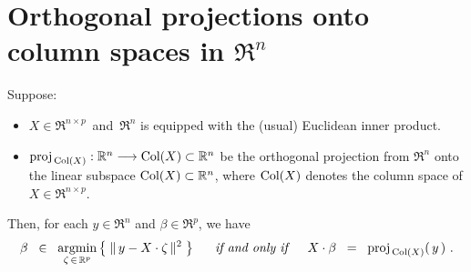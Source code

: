 

\section{Orthogonal projections onto column spaces in $\Re^{n}$}
\setcounter{theorem}{0}
\setcounter{equation}{0}

\renewcommand{\theenumi}{\roman{enumi}}
\renewcommand{\labelenumi}{\textnormal{(\theenumi)}$\;\;$}


\begin{proposition}
\mbox{}
\vskip 0.1cm
\noindent
Suppose:
\begin{itemize}
\item
	$X \in \Re^{n \times p}$\, and \,$\Re^{n}$ is equipped with the (usual) Euclidean inner product.
\item
	$\textnormal{proj}_{\,\textnormal{Col}(X)} : \mathbb{R}^{n} \longrightarrow \textnormal{Col}(X) \subset \mathbb{R}^{n}$
	be the orthogonal projection from $\Re^{n}$ onto the linear subspace $\textnormal{Col}(X) \subset \mathbb{R}^{n}$,
	where $\textnormal{Col}(X)$ denotes the column space of $X \in \Re^{n \times p}$.
\end{itemize}
Then, for each $y \in \Re^{n}$ and $\beta \in \Re^{p}$, we have
\begin{equation*}
\beta \;\;\in\;\; \underset{\zeta\,\in\,\mathbb{R}^{p}}{\textnormal{argmin}}\left\{\;\Vert\,y - X \cdot \zeta\,\Vert^{2}\;\right\}
\quad\;\;\textnormal{\it if and only if}\quad\;\;
X\cdot\beta \;\; = \;\; \textnormal{proj}_{\,\textnormal{Col}(X)}\!\left(\,y\,\right)\,.
\end{equation*}
\end{proposition}


